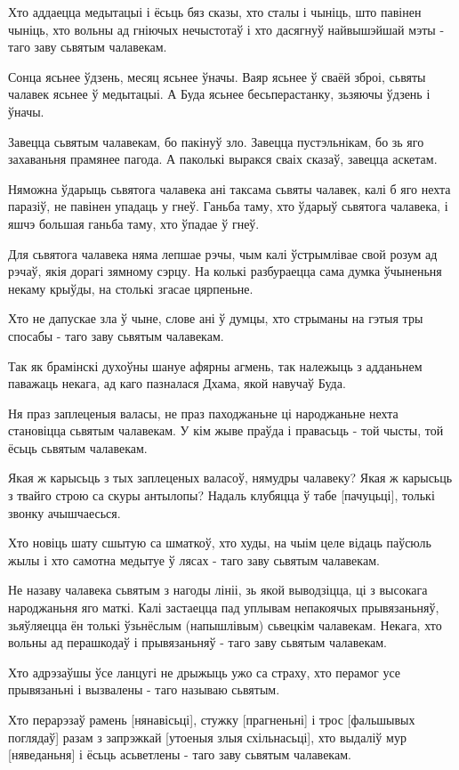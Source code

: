 \documentclass{article}
\begin{document}
Хто аддаецца медытацыі і ёсьць бяз сказы, хто сталы і чыніць, што
павінен чыніць, хто вольны ад гніючых нечыстотаў і хто дасягнуў
найвышэйшай мэты - таго заву сьвятым чалавекам.

Сонца ясьнее ўдзень, месяц ясьнее ўначы. Ваяр ясьнее ў сваёй зброі,
сьвяты чалавек ясьнее ў медытацыі. А Буда ясьнее бесьперастанку, зьзяючы
ўдзень і ўначы.

Завецца сьвятым чалавекам, бо пакінуў зло. Завецца пустэльнікам, бо
зь яго захаваньня прамянее пагода. А паколькі выракся сваіх сказаў,
завецца аскетам.

Няможна ўдарыць сьвятога чалавека ані таксама сьвяты чалавек, калі
б яго нехта паразіў, не павінен упадаць у гнеў. Ганьба таму, хто ўдарыў
сьвятога чалавека, і яшчэ большая ганьба таму, хто ўпадае ў гнеў.

Для сьвятога чалавека няма лепшае рэчы, чым калі ўстрымлівае свой
розум ад рэчаў, якія дорагі зямному сэрцу. На колькі разбураецца сама
думка ўчыненьня некаму крыўды, на столькі згасае цярпеньне.

Хто не дапускае зла ў чыне, слове ані ў думцы, хто стрыманы на
гэтыя тры спосабы - таго заву сьвятым чалавекам.

Так як брамінскі духоўны шануе афярны агмень, так належыць з
адданьнем паважаць некага, ад каго пазналася Дхама, якой навучаў Буда.

Ня праз заплеценыя валасы, не праз паходжаньне ці народжаньне нехта
становіцца сьвятым чалавекам. У кім жыве праўда і правасьць - той чысты,
той ёсьць сьвятым чалавекам.

Якая ж карысьць з тых заплеценых валасоў, нямудры чалавеку? Якая ж
карысьць з твайго строю са скуры антылопы? Надаль клубяцца ў табе
{[}пачуцьці{]}, толькі звонку ачышчаесься.

Хто новіць шату сшытую са шматкоў, хто худы, на чыім целе відаць
паўсюль жылы і хто самотна медытуе ў лясах - таго заву сьвятым
чалавекам.

Не назаву чалавека сьвятым з нагоды лініі, зь якой выводзіцца, ці з
высокага народжаньня яго маткі. Калі застаецца пад уплывам непакоячых
прывязаньняў, зьяўляецца ён толькі ўзьнёслым (напышлівым) сьвецкім
чалавекам. Некага, хто вольны ад перашкодаў і прывязаньняў - таго заву
сьвятым чалавекам.

Хто адрэзаўшы ўсе ланцугі не дрыжыць ужо са страху, хто перамог усе
прывязаньні і вызвалены - таго называю сьвятым.

Хто перарэзаў рамень {[}нянавісьці{]}, стужку {[}прагненьні{]} і
трос {[}фальшывых поглядаў{]} разам з запрэжкай {[}утоеныя злыя
схільнасьці{]}, хто выдаліў мур {[}няведаньня{]} і ёсьць асьветлены -
таго заву сьвятым чалавекам.
\end{document}

